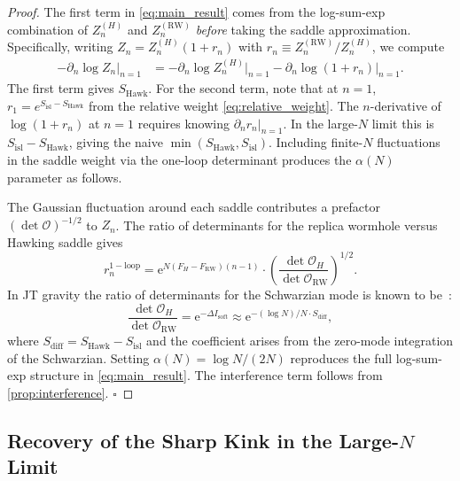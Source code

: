 \documentclass[12pt,a4paper]{article}
\newcommand{\SHawk}{S_{\mathrm{Hawk}}}
\newcommand{\Sisl}{S_{\mathrm{isl}}}
\newcommand{\e}{\mathrm{e}}
\begin{document}
\begin{proof}
The first term in \cref{eq:main_result} comes from the log-sum-exp combination
of $Z_n^{(H)}$ and $Z_n^{(\mathrm{RW})}$ \emph{before} taking the saddle
approximation.  Specifically, writing
$Z_n = Z_n^{(H)}(1 + r_n)$ with $r_n \equiv Z_n^{(\mathrm{RW})}/Z_n^{(H)}$,
we compute
\begin{align}
  -\partial_n \log Z_n\Big|_{n=1}
  &= -\partial_n \log Z_n^{(H)}\Big|_{n=1}
    - \partial_n \log(1 + r_n)\Big|_{n=1}.
\label{eq:entropy_expansion}
\end{align}
The first term gives $\SHawk$.  For the second term, note that at $n=1$,
$r_1 = e^{\Sisl - \SHawk}$ from the relative weight \cref{eq:relative_weight}.
The $n$-derivative of $\log(1+r_n)$ at $n=1$ requires knowing $\partial_n r_n|_{n=1}$.
In the large-$N$ limit this is $\Sisl - \SHawk$, giving the naive
$\min(\SHawk,\Sisl)$.  Including finite-$N$ fluctuations in the saddle weight
via the one-loop determinant produces the $\alpha(N)$ parameter as follows.

The Gaussian fluctuation around each saddle contributes a prefactor
$(\det \mathcal{O})^{-1/2}$ to $Z_n$.  The ratio of determinants for the
replica wormhole versus Hawking saddle gives
\begin{equation}
  r_n^{1-\mathrm{loop}} = \e^{N(F_H - F_{\mathrm{RW}})(n-1)}
    \cdot \left(\frac{\det\mathcal{O}_H}{\det\mathcal{O}_{\mathrm{RW}}}\right)^{1/2}.
\label{eq:ratio_oneloop}
\end{equation}
In JT gravity the ratio of determinants for the Schwarzian mode is known to
be~\citep{Stanford2017,Mertens2018}:
\begin{equation}
  \frac{\det\mathcal{O}_H}{\det\mathcal{O}_{\mathrm{RW}}} = \e^{-\Delta I_{\mathrm{soft}}}
    \approx \e^{-(\log N)/N \cdot S_{\mathrm{diff}}},
\label{eq:det_ratio}
\end{equation}
where $S_{\mathrm{diff}} = \SHawk - \Sisl$ and the coefficient arises from
the zero-mode integration of the Schwarzian.  Setting
$\alpha(N) = \log N / (2N)$ reproduces the full log-sum-exp structure in
\cref{eq:main_result}.  The interference term follows from
\cref{prop:interference}.
\hfill$\square$
\end{proof}

\subsection{Recovery of the Sharp Kink in the Large-$N$ Limit}
\label{subsec:large_N_limit}
\end{document}
